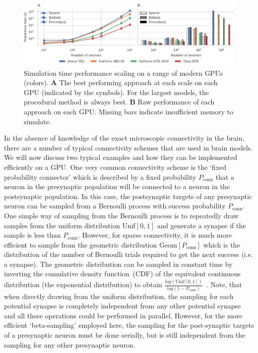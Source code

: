 \documentclass[9pt,twocolumn,twoside,lineno]{pnas-new}
\begin{document}
\begin{figure}
    \centering
    \includegraphics{figures/performance_scaling}
    \caption{Simulation time performance scaling on a range of modern GPUs (colors). \textbf{A} The best performing approach at each scale on each GPU (indicated by the symbols). For the largest models, the procedural method is always best.
    \textbf{B} Raw performance of each approach on each GPU.
    Missing bars indicate insufficient memory to simulate.}
    \label{fig:performance_scaling}
\end{figure}

In the absence of knowledge of the exact microscopic connectivity in the brain, there are a number of typical connectivity schemes that are used in brain models.
We will now discuss two typical examples and how they can be implemented efficiently on a GPU.
One very common connectivity scheme is the `fixed probability connector' which is described by a fixed probability $P_{\text{conn}}$ that a neuron in the presynaptic population will be connected to a neuron in the postsynaptic population.
In this case, the postsynaptic targets of any presynaptic neuron can be sampled from a Bernoulli process with success probability $P_{\text{conn}}$.
One simple way of sampling from the Bernoulli process is to repeatedly draw samples from the uniform distribution $\text{Unif}[0, 1]$ and generate a synapse if the sample is less than $P_{\text{conn}}$.
However, for sparse connectivity, it is much more efficient to sample from the geometric distribution $\text{Geom}[P_{\text{conn}}]$ which is the distribution of the number of Bernoulli trials required to get the next success (i.e. a synapse).
The geometric distribution can be sampled in constant time by inverting the cumulative density function~(CDF) of the equivalent continuous distribution (the exponential distribution) to obtain $\frac{log(\text{Unif}[0, 1])}{log(1 - P_{\text{conn}})}$~\citep[p499]{DevroyeLuc2013}.
Note, that when directly drawing from the uniform distribution, the sampling for each potential synapse is completely independent from any other potential synapse and all these operations could be performed in parallel.
However, for the more efficient `beta-sampling' employed here, the sampling for the post-synaptic targets of a presynaptic neuron must be done serially, but is still independent from the sampling for any other presynaptic neuron.
\end{document}

